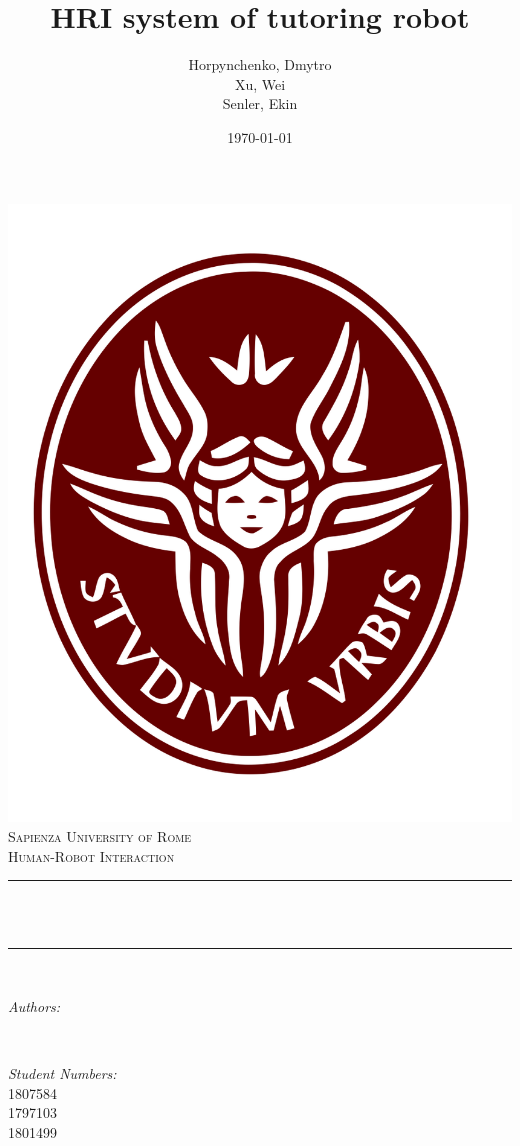 \documentclass[12pt]{article}
\title{HRI system of tutoring robot}			%
\author{Horpynchenko, Dmytro \\ Xu, Wei \\ Senler, Ekin} 								%
\date{\today}											%
\makeatletter
\newcommand{\studentnumber}{1807584 \\ 1797103 \\ 1801499}
\let\thetitle\@title
\let\theauthor\@author
\makeatother
\begin{document}

\begin{titlepage}
	\centering
    \includegraphics[scale = 0.2]{images/sapienza_logo_only.png}\\[1.0 cm]	%
    \textsc{\LARGE Sapienza University of Rome}\\[2.0 cm]	%
    \vspace{2cm}
	\textsc{\Large Human-Robot Interaction}\\[0.5 cm]				%
	\rule{\linewidth}{0.2 mm} \\[0.4 cm]
	{ \huge \bfseries \thetitle}\\
	\rule{\linewidth}{0.2 mm} \\[1.5 cm]

	\begin{minipage}{0.4\textwidth}
		\begin{flushleft} \large
			\emph{Authors:}\\
			\theauthor
			\end{flushleft}
			\end{minipage}~
			\begin{minipage}{0.4\textwidth}
			\begin{flushright} \large
			\emph{Student Numbers:} \\
			\studentnumber
		\end{flushright}
	\end{minipage}\\[2 cm]


	\vfill

\end{titlepage}
\end{document}
